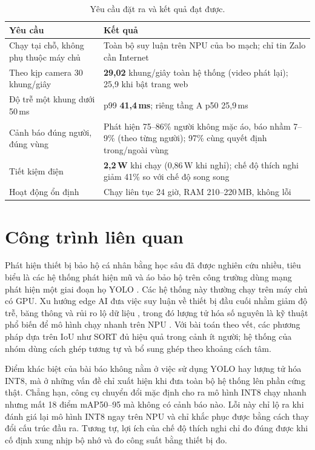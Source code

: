 \documentclass[11pt,a4paper,twocolumn]{article}
\begin{document}
\begin{table}[t]
\centering
\caption{Yêu cầu đặt ra và kết quả đạt được.}
\label{tab:req}
\footnotesize
\begin{tabular}{@{}>{\raggedright\arraybackslash}p{2.9cm}>{\raggedright\arraybackslash}p{4.9cm}@{}}
\toprule
Yêu cầu & Kết quả \\
\midrule
Chạy tại chỗ, không phụ thuộc máy chủ & Toàn bộ suy luận trên NPU của bo mạch; chỉ tin Zalo cần Internet \\
Theo kịp camera 30 khung/giây & \textbf{29,02} khung/giây toàn hệ thống (video phát lại); 25,9 khi bật trang web \\
Độ trễ một khung dưới 50\,ms & p99 \textbf{41,4\,ms}; riêng tầng A p50 25,9\,ms \\
Cảnh báo đúng người, đúng vùng & Phát hiện 75--86\% người không mặc áo, báo nhầm 7--9\% (theo từng người); 97\% cùng quyết định trong/ngoài vùng \\
Tiết kiệm điện & \textbf{2,2\,W} khi chạy (0,86\,W khi nghỉ); chế độ thích nghi giảm 41\% so với chế độ song song \\
Hoạt động ổn định & Chạy liên tục 24 giờ, RAM 210--220\,MB, không lỗi \\
\bottomrule
\end{tabular}
\end{table}

\section{Công trình liên quan}

Phát hiện thiết bị bảo hộ cá nhân bằng học sâu đã được nghiên cứu nhiều, tiêu biểu là các hệ thống phát hiện mũ và áo bảo hộ trên công trường dùng mạng phát hiện một giai đoạn
họ YOLO \cite{nath,yolov1}. Các hệ thống này thường chạy trên máy chủ có GPU. Xu hướng edge AI đưa việc suy luận về thiết bị đầu cuối nhằm giảm độ trễ, băng thông và rủi ro lộ dữ liệu
\cite{chen}, trong đó lượng tử hóa số nguyên là kỹ thuật phổ biến để mô hình chạy nhanh trên NPU \cite{jacob}. Với bài toán theo vết, các phương pháp dựa trên IoU như SORT \cite{sort}
đủ hiệu quả trong cảnh ít người; hệ thống của nhóm dùng cách ghép tương tự và bổ sung ghép theo khoảng cách tâm.

Điểm khác biệt của bài báo không nằm ở việc sử dụng YOLO hay lượng tử hóa INT8, mà ở những vấn đề chỉ xuất hiện khi đưa toàn bộ hệ thống lên phần cứng thật. Chẳng hạn, công cụ
chuyển đổi mặc định cho ra mô hình INT8 chạy nhanh nhưng mất 18 điểm mAP50--95 mà không có cảnh báo nào. Lỗi này chỉ lộ ra khi đánh giá lại mô hình INT8 ngay trên NPU và chỉ khắc
phục được bằng cách thay đổi cấu trúc đầu ra. Tương tự, lợi ích của chế độ thích nghi chỉ đo đúng được khi cố định xung nhịp bộ nhớ và đo công suất bằng thiết bị đo.
\end{document}
